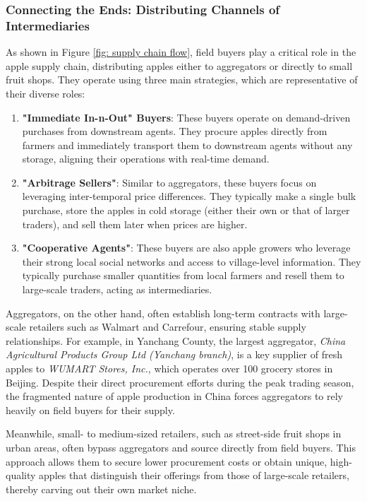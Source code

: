 \subsubsection{Connecting the Ends: Distributing Channels of Intermediaries}
\noindent As shown in Figure \ref{fig: supply chain flow}, field buyers play a critical role in the apple supply chain, distributing apples either to aggregators or directly to small fruit shops. They operate using three main strategies, which are representative of their diverse roles:

\begin{enumerate}
    \item \textbf{"Immediate In-n-Out" Buyers}: These buyers operate on demand-driven purchases from downstream agents. They procure apples directly from farmers and immediately transport them to downstream agents without any storage, aligning their operations with real-time demand.

    \item \textbf{"Arbitrage Sellers"}: Similar to aggregators, these buyers focus on leveraging inter-temporal price differences. They typically make a single bulk purchase, store the apples in cold storage (either their own or that of larger traders), and sell them later when prices are higher.

    \item \textbf{"Cooperative Agents"}: These buyers are also apple growers who leverage their strong local social networks and access to village-level information. They typically purchase smaller quantities from local farmers and resell them to large-scale traders, acting as intermediaries.
\end{enumerate}

Aggregators, on the other hand, often establish long-term contracts with large-scale retailers such as Walmart and Carrefour, ensuring stable supply relationships. For example, in Yanchang County, the largest aggregator, \textit{China Agricultural Products Group Ltd (Yanchang branch)}, is a key supplier of fresh apples to \textit{WUMART Stores, Inc.}, which operates over 100 grocery stores in Beijing. Despite their direct procurement efforts during the peak trading season, the fragmented nature of apple production in China forces aggregators to rely heavily on field buyers for their supply.

Meanwhile, small- to medium-sized retailers, such as street-side fruit shops in urban areas, often bypass aggregators and source directly from field buyers. This approach allows them to secure lower procurement costs or obtain unique, high-quality apples that distinguish their offerings from those of large-scale retailers, thereby carving out their own market niche.

